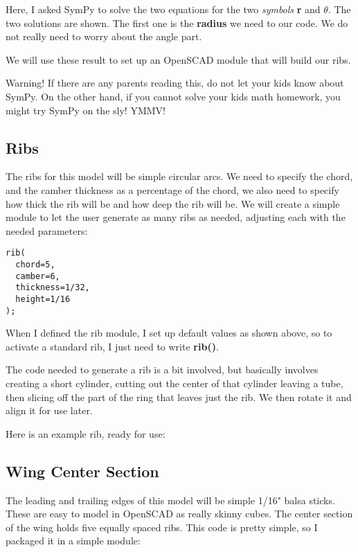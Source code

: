 Here, I asked SymPy to solve the two equations for the two {\it symbols} {\bf
r} and {$ \theta $}. The two solutions are shown. The first one is the {\bf
radius} we need to our code.  We do not really need to worry about the angle
part.

We will use these result to set up an OpenSCAD module that will build our ribs.

Warning! If there are any parents reading this, do not let your kids know about
SymPy.  On the other hand, if you cannot solve your kids math homework, you
might try SymPy on the sly! YMMV!

\subsection{Ribs}

The ribs for this model will be simple circular arcs. We need to specify the
chord, and the camber thickness as a percentage of the chord, we also need to
specify how thick the rib will be and how deep the rib will be. We will create
a simple module to let the user generate as many ribs as needed, adjusting each
with the needed parameters:

\begin{lstlisting}
rib(
  chord=5,
  camber=6,
  thickness=1/32,
  height=1/16
);
\end{lstlisting}

When I defined the rib module, I set up default values as shown above, so to
activate a standard rib, I just need to write {\bf rib()}.

The code needed to generate a rib is a bit involved, but basically involves
creating a short cylinder, cutting out the center of that cylinder leaving a
tube, then slicing off the part of the ring that leaves just the rib. We then
rotate it and align it for use later.

Here is an example rib, ready for use:


\subsection{Wing Center Section}

The leading and trailing edges of this model will be simple 1/16" balsa sticks.
These are easy to model in OpenSCAD as really skinny cubes. The center section
of the wing holds five equally spaced ribs. This code is pretty simple, so I
packaged it in a simple module:

